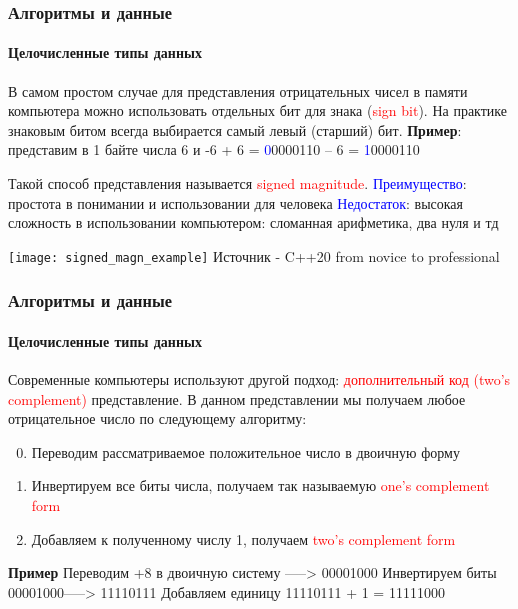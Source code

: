 \documentclass[aspectratio=169]{beamer}
\begin{document}
\begin{frame}
\frametitle{Алгоритмы и данные}
\framesubtitle{Целочисленные типы данных}
\justifying
\small
В самом простом случае для представления отрицательных чисел в памяти компьютера можно использовать отдельных бит для знака (\textcolor{red}{sign bit}). На практике знаковым битом всегда выбирается самый левый (старший) бит.\newline\newline
\textbf{Пример}: представим в 1 байте числа 6 и -6\newline
+ 6  = \textcolor{blue}{0}0000110\newline
– 6  = \textcolor{blue}{1}0000110

Такой способ представления называется \textcolor{red}{signed magnitude}.\newline
\textcolor{blue}{Преимущество}: простота в понимании и использовании для человека\newline  
\textcolor{blue}{Недостаток}: высокая сложность в использовании компьютером: сломанная арифметика, два нуля и тд

\centering
\texttt{[image: signed\_magn\_example]}\newline
\centering
\tiny Источник - C++20 from novice to professional
\end{frame}

\begin{frame}
\frametitle{Алгоритмы и данные}
\framesubtitle{Целочисленные типы данных}
\justifying
\small
Современные компьютеры используют другой подход: \textcolor{red}{дополнительный код (two’s complement)} представление.
В данном представлении мы получаем любое отрицательное число по следующему алгоритму:
\begin{enumerate}
  \setcounter{enumi}{-1}
  \item{Переводим рассматриваемое положительное число в двоичную форму}
  \item{Инвертируем все биты числа, получаем так называемую \textcolor{red}{one’s complement form}}
  \item{Добавляем к полученному числу 1, получаем \textcolor{red}{two’s complement form}}
\end{enumerate}

\textbf{Пример}\newline
Переводим +8 в двоичную систему -----> 00001000\newline
Инвертируем биты 00001000\quad\quad\quad -----> 11110111\newline
Добавляем единицу 11110111 + 1 \quad\quad = 11111000\newline

\end{frame}
\end{document}
